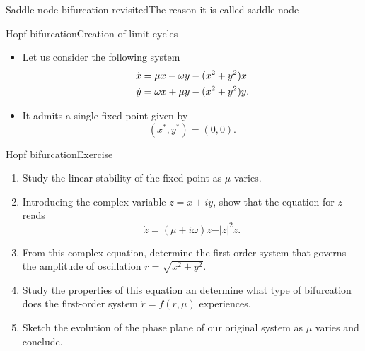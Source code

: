 \documentclass[usenames,dvipsnames,svgnames,10pt,aspectratio=169]{beamer}
\begin{document}
\begin{frame}[t, c]{Saddle-node bifurcation revisited}{The reason it is called saddle-node}

\end{frame}

\begin{frame}[t, c]{Hopf bifurcation}{Creation of limit cycles}
	\begin{itemize}
		\item Let us consider the following system
		\begin{equation}
			\begin{aligned}
				\dot{x} & = \mu x - \omega y - (x^2 + y^2)x \\
				\dot{y} & = \omega x + \mu y - (x^2 + y^2)y.
			\end{aligned}
			\notag
		\end{equation}

		\medskip

		\item It admits a single fixed point given by
		$$(x^*, y^*) = (0, 0).$$
	\end{itemize}

	\vspace{1cm}
\end{frame}

\begin{frame}[t, c]{Hopf bifurcation}{Exercise}
	\begin{enumerate}
		\item Study the linear stability of the fixed point as $\mu$ varies.
		\item Introducing the complex variable $z = x + iy$, show that the equation for $z$ reads
		$$\dot{z} = (\mu + i\omega)z - \vert z \vert^2z.$$
		\item From this complex equation, determine the first-order system that governs the amplitude of oscillation $r = \sqrt{x^2 + y^2}$.
		\item Study the properties of this equation an determine what type of bifurcation does the first-order system $\dot{r} = f(r, \mu)$ experiences.
		\item Sketch the evolution of the phase plane of our original system as $\mu$ varies and conclude.
	\end{enumerate}

	\vspace{1cm}
\end{frame}
\end{document}
